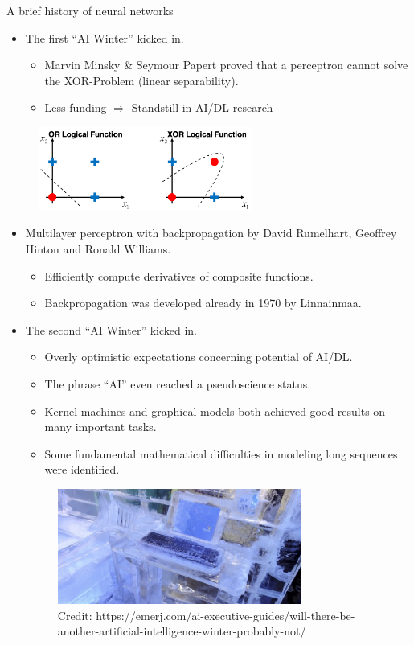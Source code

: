 \begin{vbframe}{A brief history of neural networks}
\begin{itemize}
\item {} The first \enquote{AI Winter} kicked in.
\begin{itemize}
\item Marvin Minsky \& Seymour Papert proved that a perceptron cannot solve the XOR-Problem (linear separability).
\item Less funding $\Rightarrow$ Standstill in AI/DL research
\end{itemize}
\end{itemize}
\begin{figure}
\includegraphics[width=7cm]{figure/orvsxor.png}
\end{figure}
\begin{itemize}
\item {} Multilayer perceptron with backpropagation by David Rumelhart, Geoffrey Hinton and Ronald Williams.
\begin{itemize}
\item Efficiently compute derivatives of composite functions.
\item Backpropagation was developed already in 1970 by Linnainmaa.
\end{itemize}
\framebreak

\item {} The second \enquote{AI Winter} kicked in.

\begin{itemize}
\footnotesize\item Overly optimistic expectations concerning potential of AI/DL.
\footnotesize\item The phrase \enquote{AI} even reached a pseudoscience status.
\footnotesize\item Kernel machines and graphical models both achieved good results on many important tasks.
\footnotesize\item Some fundamental mathematical difficulties in modeling long sequences were identified.
\end{itemize}
\begin{figure}
\includegraphics[width=8cm]{figure/ai_winter.jpg}
\\
\tiny{Credit: https://emerj.com/ai-executive-guides/will-there-be-another-artificial-intelligence-winter-probably-not/}
\end{figure}
\framebreak


\end{itemize}
\end{vbframe}
